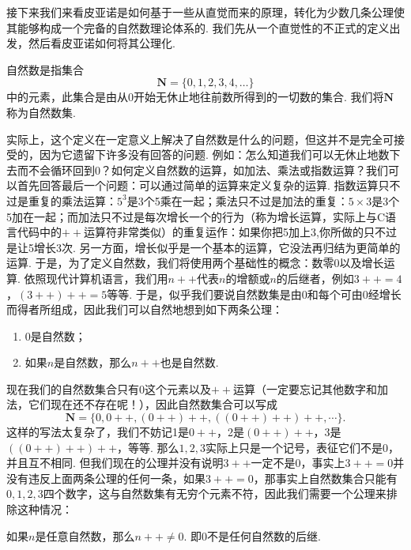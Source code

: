 接下来我们来看皮亚诺是如何基于一些从直觉而来的原理，转化为少数几条公理使其能够构成一个完备的自然数理论体系的. 我们先从一个直觉性的不正式的定义出发，然后看皮亚诺如何将其公理化.

\begin{definition}%
    自然数是指集合
    \[\mathbf{N}=\{0,1,2,3,4,\ldots\}\]
    中的元素，此集合是由从0开始无休止地往前数所得到的一切数的集合. 我们将$\mathbf{N}$称为自然数集.
\end{definition}

实际上，这个定义在一定意义上解决了自然数是什么的问题，但这并不是完全可接受的，因为它遗留下许多没有回答的问题. 例如：怎么知道我们可以无休止地数下去而不会循环回到0？如何定义自然数的运算，如加法、乘法或指数运算？我们可以首先回答最后一个问题：可以通过简单的运算来定义复杂的运算. 指数运算只不过是重复的乘法运算：$5^3$是3个5乘在一起；乘法只不过是加法的重复：$5\times 3$是3个5加在一起；而加法只不过是每次增长一个的行为（称为增长运算，实际上与C语言代码中的$++$运算符非常类似）的重复运作：如果你把5加上3,你所做的只不过是让5增长3次. 另一方面，增长似乎是一个基本的运算，它没法再归结为更简单的运算. 于是，为了定义自然数，我们将使用两个基础性的概念：数零0以及增长运算. 依照现代计算机语言，我们用$n++$代表$n$的增额或$n$的后继者，例如$3++=4$，$(3++)++=5$等等. 于是，似乎我们要说自然数集是由0和每个可由0经增长而得者所组成，因此我们可以自然地想到如下两条公理：

\begin{axiom}
    \begin{enumerate}
        \item 0是自然数；

        \item 如果$n$是自然数，那么$n++$也是自然数.
    \end{enumerate}
\end{axiom}

现在我们的自然数集合只有0这个元素以及$++$运算（一定要忘记其他数字和加法，它们现在还不存在呢！），因此自然数集合可以写成
\[\mathbf{N}=\{0,0++,(0++)++,((0++)++)++,\cdots\}.\]
这样的写法太复杂了，我们不妨记1是$0++$，2是$(0++)++$，3是$((0++)++)++$，等等. 那么$1,2,3$实际上只是一个记号，表征它们不是0，并且互不相同. 但我们现在的公理并没有说明$3++$一定不是0，事实上$3++=0$并没有违反上面两条公理的任何一条，如果$3++=0$，那事实上自然数集合只能有$0,1,2,3$四个数字，这与自然数集有无穷个元素不符，因此我们需要一个公理来排除这种情况：

\begin{axiom}%
    如果$n$是任意自然数，那么$n++\neq 0$. 即0不是任何自然数的后继.
\end{axiom}

